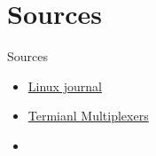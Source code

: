 \documentclass[usenames,dvipsnames,10pt,aspectratio=169]{beamer}
\begin{document}
\section{Sources}
\begin{frame}{Sources}
    \begin{itemize}
        \item \href{https://www.linuxjournal.com/node/1203742}{Linux journal}
        \item \href{https://opensource.com/article/21/5/linux-terminal-multiplexer}{Termianl Multiplexers}
        \item \href{}{}
        
    \end{itemize}
\end{frame}
\end{document}
